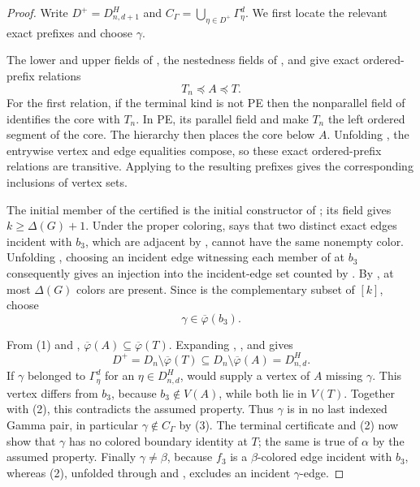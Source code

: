 \begin{proof}
Write $D^+=D^H_{n,d+1}$ and
$C_\Gamma=\bigcup_{\eta\in D^+}\Gamma^d_\eta$.  We first locate the
relevant exact prefixes and choose $\gamma$.

The lower and upper fields of , the
nestedness fields of , and
 give exact ordered-prefix relations
\[
                         T_n\preccurlyeq A\preccurlyeq T.       \tag{1}
\]
For the first relation, if the terminal kind is not PE then the
nonparallel field of  identifies the core with
$T_n$.  In PE, its parallel field and  make
$T_n$ the left ordered segment of the core.  The hierarchy then places
the core below $A$.  Unfolding ,
the entrywise vertex and edge equalities compose, so these exact
ordered-prefix relations are transitive.  Applying
 to the resulting prefixes gives the
corresponding inclusions of vertex sets.

The initial member of the certified  is the
initial constructor of ; its
 field gives $k\geq\Delta(G)+1$.  Under the proper
coloring,  says that two distinct exact
edges incident with $b_3$, which are adjacent by
, cannot have the same nonempty color.
Unfolding , choosing an incident edge witnessing each
member of  at $b_3$ consequently gives an
injection into the incident-edge set counted by .  By
, at most $\Delta(G)$ colors are present.  Since
 is the complementary subset of $[k]$, choose
\[
                         \gamma\in\overline\varphi(b_3).       \tag{2}
\]

From (1) and ,
$\overline\varphi(A)\subseteq\overline\varphi(T)$.  Expanding
, , and
 gives
\[
 D^+=D_n\setminus\overline\varphi(T)
       \subseteq D_n\setminus\overline\varphi(A)=D^H_{n,d}.  \tag{3}
\]
If $\gamma$ belonged to $\Gamma^d_\eta$ for an
$\eta\in D^H_{n,d}$,  would
supply a vertex of $A$ missing $\gamma$.  This vertex differs from
$b_3$, because $b_3\notin V(A)$, while both lie in $V(T)$.  Together
with (2), this contradicts the assumed
 property.  Thus $\gamma$ is in no
last indexed Gamma pair, in particular $\gamma\notin C_\Gamma$ by (3).
The terminal  certificate and (2) now
show that $\gamma$ has no colored boundary identity at $T$; the same is
true of $\alpha$ by the assumed  property.
Finally $\gamma\ne\beta$, because $f_3$ is a $\beta$-colored edge
incident with $b_3$, whereas (2), unfolded through
 and , excludes an
incident $\gamma$-edge.


\end{proof}

